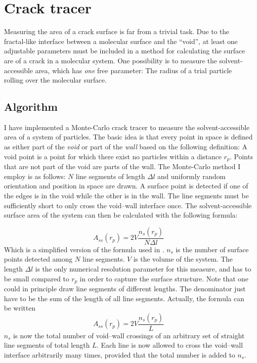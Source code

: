 \section{Crack tracer}
Measuring the area of a crack surface is far from a trivial task. Due to the fractal-like interface between a molecular surface and the ``void'', at least one adjustable parameters must be included in a method for calculating the surface are of a crack in a molecular system. One possibility is to measure the solvent-accessible area, which has \emph{one} free parameter: The radius of a trial particle rolling over the molecular surface. 


\subsection{Algorithm}
I have implemented a Monte-Carlo crack tracer to measure the solvent-accessible area of a system of particles. The basic idea is that every point in space is defined as either part of the \emph{void} or part of the \emph{wall} based on the following definition: A void point is a point for which there exist no particles within a distance $r_p$. Points that are not part of the void are parts of the wall. The Monte-Carlo method I employ is as follows: $N$ line segments of length $\Delta l$ and uniformly random orientation and position in space are drawn. A surface point is detected if one of the edges is in the void while the other is in the wall. The line segments must be sufficiently short to only cross the void--wall interface once. The solvent-accessible surface area of the system can then be calculated with the following formula:

\begin{equation}
A_{ss}(r_p) = 2V\frac{n_s(r_p)}{N\Delta l}
\label{eq:crack_tracer}
\end{equation}
Which is a simplified version of the formula used in \citet{Bhattacharya2009}. $n_s$ is the number of surface points detected among $N$ line segments. $V$ is the volume of the system. The length $\Delta l$ is the only numerical resolution parameter for this measure, and has to be small compared to $r_p$ in order to capture the surface structure. Note that one could in principle draw line segments of different lengths. The denominator just have to be the sum of the length of all line segments. Actually, the formula can be written
\begin{equation}
	A_{ss}(r_p) = 2V\frac{n_s(r_p)}{L}
\end{equation}
$n_s$ is now the total number of void--wall crossings of an arbitrary set of straight line segments of total length $L$. Each line is now allowed to cross the void--wall interface arbitrarily many times, provided that the total number is added to $n_s$.

